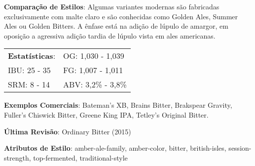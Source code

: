 \textbf{Comparação de Estilos}: Algumas variantes modernas são fabricadas exclusivamente com malte claro e são conhecidas como Golden Ales, Summer Ales ou Golden Bitters. A ênfase está na adição de lúpulo de amargor, em oposição a agressiva adição tardia de lúpulo vista em ales americanas.

\begin{tabular}{@{}p{35mm}p{35mm}@{}}
  \textbf{Estatísticas}: & OG: 1,030 - 1,039 \\
  IBU: 25 - 35  & FG: 1,007 - 1,011  \\
  SRM: 8 - 14  & ABV: 3,2\% - 3,8\%
\end{tabular}

\textbf{Exemplos Comerciais}: Bateman’s XB, Brains Bitter, Brakspear Gravity, Fuller's Chiswick Bitter, Greene King IPA, Tetley’s Original Bitter.

\textbf{Última Revisão}: Ordinary Bitter (2015)

\textbf{Atributos de Estilo}: amber-ale-family, amber-color, bitter, british-isles, session-strength, top-fermented, traditional-style